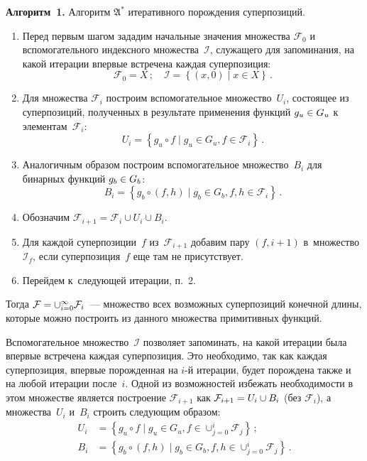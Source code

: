 \begin{multicols}{2}
\noindent
\textbf{Алгоритм~1.}
  Алгоритм $\mathfrak{A^*}$ итеративного порождения суперпозиций.
\begin{enumerate}[1.]
  \item Перед первым шагом зададим начальные значения множества
    $\mathcal{F}_0$ и вспомогательного индексного множества~$\mathcal{I}$,
    служащего для запоминания, на какой итерации впервые встречена
    каждая суперпозиция:
    \begin{equation*}
      \mathcal{F}_0 = X\,;\quad
      \mathcal{I} = \left\{ (x, 0) \mid x \in X \right\}\,.
\end{equation*}
  \item Для множества $\mathcal{F}_i$ построим вспомогательное множество~$U_i$,
    состоящее из суперпозиций, полученных в результате применения функций
    $g_u \hm\in G_u$ к элементам~$\mathcal{F}_i$:
    $$
      U_i = \left\{ g_u \circ f \mid g_u \in G_u, f \in \mathcal{F}_i \right\}\,.
$$
  \item Аналогичным образом построим вспомогательное множество~$B_i$ для
    бинарных функций $g_b \hm\in G_b$:
    $$
      B_i = \left\{ g_b \circ (f, h) \mid g_b \in G_b, f, h \in \mathcal{F}_i \right\}\,.
$$
  \item Обозначим $\mathcal{F}_{i+1} = \mathcal{F}_i \cup U_i \cup B_i$.
  \item Для каждой суперпозиции~$f$ из~$\mathcal{F}_{i+1}$ добавим пару
    $(f, i+1)$ в~множество $\mathcal{I}_f$, если суперпозиция~$f$ еще там
    не присутствует.
  \item Перейдем к~следующей итерации, п.~2.
\end{enumerate}

Тогда $\mathcal{F} \hm= \cup_{i=0}^\infty \mathcal{F}_i$~--- множество всех
возможных суперпозиций конечной длины, которые можно построить из
данного множества примитивных функций.

Вспомогательное множество~$\mathcal{I}$ позволяет запоминать, на какой
итерации была впервые встречена каждая суперпозиция. Это необходимо, так
как каждая суперпозиция, впервые порожденная на $i$-й итерации, будет
порождена так\-же и на любой итерации после~$i$. Одной из возможностей
избежать необходимости в этом множестве является построение
$\mathcal{F}_{i+1}$ как $\mathcal{F}_{i+1} \hm= U_i \cup B_i$ (без
$\mathcal{F}_i$), а множества~$U_i$ и~$B_i$ строить следующим образом:
\begin{align*}
  U_i &= \left\{ g_u \circ f \mid g_u \in G_u, f \in \cup_{j=0}^{i} \mathcal{F}_j \right\}\,;
\\
  B_i &= \left\{ g_b \circ (f, h) \mid g_b \in G_b, f, h \in \cup_{j=0}^{i} \mathcal{F}_j \right\}\,.
\end{align*}


\end{multicols}
